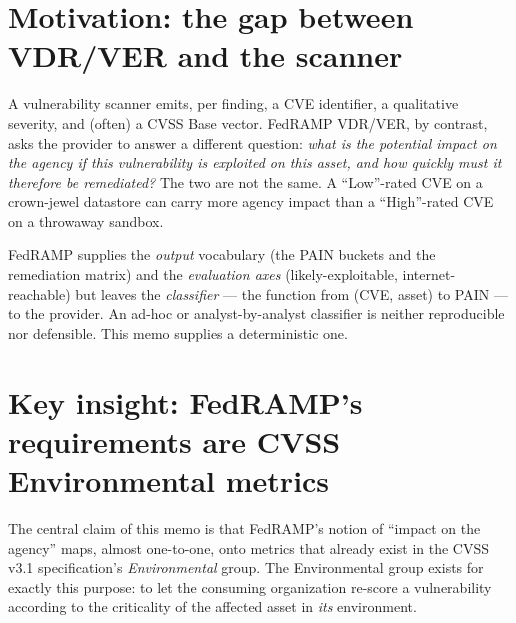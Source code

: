 \documentclass[11pt]{article}
\begin{document}
\section{Motivation: the gap between VDR/VER and the scanner}
A vulnerability scanner emits, per finding, a CVE identifier, a qualitative
severity, and (often) a CVSS Base vector. FedRAMP VDR/VER, by contrast, asks
the provider to answer a different question: \emph{what is the potential impact on
the agency if this vulnerability is exploited on this asset, and how quickly must
it therefore be remediated?} The two are not the same. A ``Low''-rated CVE on a
crown-jewel datastore can carry more agency impact than a ``High''-rated CVE on a
throwaway sandbox.

FedRAMP supplies the \emph{output} vocabulary (the PAIN buckets and the remediation
matrix) and the \emph{evaluation axes} (likely-exploitable, internet-reachable) but
leaves the \emph{classifier} --- the function from (CVE, asset) to PAIN --- to the
provider. An ad-hoc or analyst-by-analyst classifier is neither reproducible nor
defensible. This memo supplies a deterministic one.

\section{Key insight: FedRAMP's requirements are CVSS Environmental metrics}
The central claim of this memo is that FedRAMP's notion of ``impact on the agency''
maps, almost one-to-one, onto metrics that already exist in the CVSS v3.1
specification's \emph{Environmental} group. The Environmental group exists for
exactly this purpose: to let the consuming organization re-score a vulnerability
according to the criticality of the affected asset in \emph{its} environment.
\end{document}
